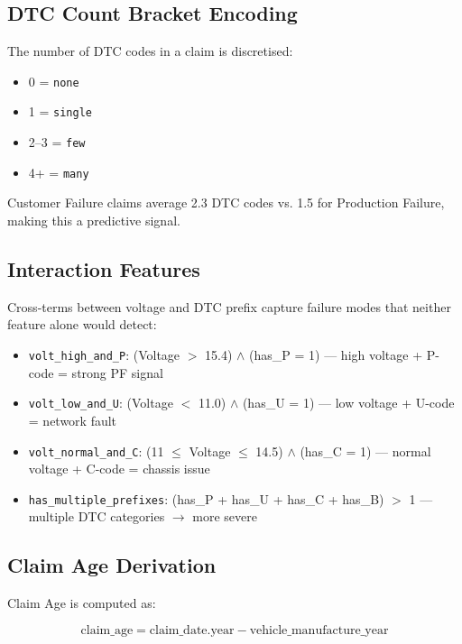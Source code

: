 \documentclass[10pt]{article}
\begin{document}
\subsection{DTC Count Bracket Encoding}

The number of DTC codes in a claim is discretised:

\begin{itemize}
    \item 0 = \texttt{none}
    \item 1 = \texttt{single}
    \item 2--3 = \texttt{few}
    \item 4+ = \texttt{many}
\end{itemize}

Customer Failure claims average 2.3 DTC codes vs. 1.5 for Production Failure, making this a predictive signal.

\subsection{Interaction Features}

Cross-terms between voltage and DTC prefix capture failure modes that neither feature alone would detect:

\begin{itemize}
    \item \texttt{volt\_high\_and\_P}: (Voltage $>$ 15.4) $\land$ (has\_P = 1) --- high voltage + P-code = strong PF signal
    \item \texttt{volt\_low\_and\_U}: (Voltage $<$ 11.0) $\land$ (has\_U = 1) --- low voltage + U-code = network fault
    \item \texttt{volt\_normal\_and\_C}: (11 $\leq$ Voltage $\leq$ 14.5) $\land$ (has\_C = 1) --- normal voltage + C-code = chassis issue
    \item \texttt{has\_multiple\_prefixes}: (has\_P + has\_U + has\_C + has\_B) $>$ 1 --- multiple DTC categories $\rightarrow$ more severe
\end{itemize}

\subsection{Claim Age Derivation}

Claim Age is computed as:

\begin{equation}
\text{claim\_age} = \text{claim\_date.year} - \text{vehicle\_manufacture\_year}
\end{equation}
\end{document}

